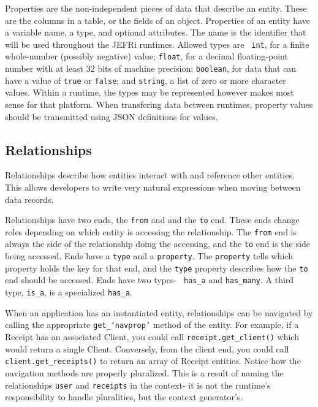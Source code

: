 \documentclass{article}
\newcommand{\ilcode}{\tt}
\begin{document}
Properties are the non-independent pieces of data that describe an entity. These
are the columns in a table, or the fields of an object. Properties of an entity
have a variable name, a type, and optional attributes. The name is the identifier
that will be used throughout the JEFRi runtimes. Allowed types are {\ilcode
int}, for a finite whole-number (possibly negative) value; {\ilcode float}, for
a decimal floating-point number with at least 32 bits of machine precision;
{\ilcode boolean}, for data that can have a value of {\ilcode true} or {\ilcode false}; and
{\ilcode string}, a list of zero or more character values. Within a runtime,
the types may be represented however makes most sense for that platform.
When transfering data between runtimes, property values should be transmitted
using JSON definitions for values.

\subsection{Relationships}

Relationships describe how entities interact with and reference
other entities. This allows developers to write very natural expressions when
moving between data records.

Relationships have two ends, the {\ilcode from} and and the {\ilcode to} end.
These ends change roles depending on which entity is accessing the relationship.
The {\ilcode from} end is always the side of the relationship doing the
accessing, and the {\ilcode to} end is the side being accessed. Ends have a
{\ilcode type} and a {\ilcode property}. The {\ilcode property} tells which
property holds the key for that end, and the {\ilcode type} property describes
how the {\ilcode to} end should be accessed. Ends have two types- {\ilcode
has\_a} and {\ilcode has\_many}. A third type, {\ilcode is\_a}, is a specialized
{\ilcode has\_a}.

When an application has an instantiated entity, relationships can be navigated
by calling the appropriate {\ilcode get\_`navprop'}
method of the entity. For example, if a Receipt has an associated Client, you
could call {\ilcode receipt.get\_client()} which would return a single Client.
Conversely, from the client end, you could call {\ilcode client.get\_receipts()}
to return an array of Receipt entities. Notice how the navigation methods are
properly pluralized. This is a result of naming the relationships {\ilcode user}
and {\ilcode receipts} in the context- it is not the runtime's responsibility to
handle pluralities, but the context generator's.
\end{document}
